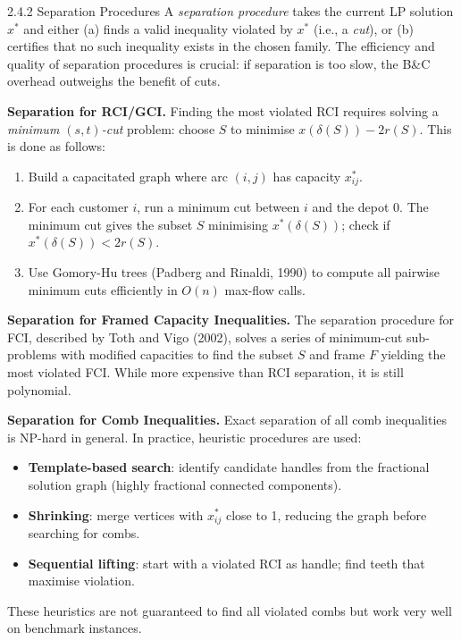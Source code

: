\documentclass[aspectratio=169,10pt]{beamer}
\begin{document}
\begin{frame}[allowframebreaks]{2.4.2 Separation Procedures}
  A \emph{separation procedure} takes the current LP solution $x^*$ and
  either (a) finds a valid inequality violated by $x^*$ (i.e., a \emph{cut}),
  or (b) certifies that no such inequality exists in the chosen family.
  The efficiency and quality of separation procedures is crucial: if
  separation is too slow, the B\&C overhead outweighs the benefit of cuts.

  \bigskip
  \textbf{Separation for RCI/GCI.} Finding the most violated RCI requires
  solving a \emph{minimum $(s,t)$-cut} problem: choose $S$ to minimise
  $x(\delta(S)) - 2r(S)$. This is done as follows:
  \begin{enumerate}
    \item Build a capacitated graph where arc $(i,j)$ has capacity $x^*_{ij}$.
    \item For each customer $i$, run a minimum cut between $i$ and the depot 0.
          The minimum cut gives the subset $S$ minimising $x^*(\delta(S))$;
          check if $x^*(\delta(S)) < 2r(S)$.
    \item Use Gomory-Hu trees (Padberg and Rinaldi, 1990) to compute all
          pairwise minimum cuts efficiently in $O(n)$ max-flow calls.
  \end{enumerate}

  \framebreak

  \textbf{Separation for Framed Capacity Inequalities.}
  The separation procedure for FCI, described by Toth and Vigo (2002),
  solves a series of minimum-cut sub-problems with modified capacities to
  find the subset $S$ and frame $F$ yielding the most violated FCI. While
  more expensive than RCI separation, it is still polynomial.

  \bigskip
  \textbf{Separation for Comb Inequalities.}
  Exact separation of all comb inequalities is NP-hard in general.
  In practice, heuristic procedures are used:
  \begin{itemize}
    \item \textbf{Template-based search}: identify candidate handles from
          the fractional solution graph (highly fractional connected components).
    \item \textbf{Shrinking}: merge vertices with $x^*_{ij}$ close to 1,
          reducing the graph before searching for combs.
    \item \textbf{Sequential lifting}: start with a violated RCI as handle;
          find teeth that maximise violation.
  \end{itemize}
  These heuristics are not guaranteed to find all violated combs but work
  very well on benchmark instances.


\end{frame}
\end{document}
